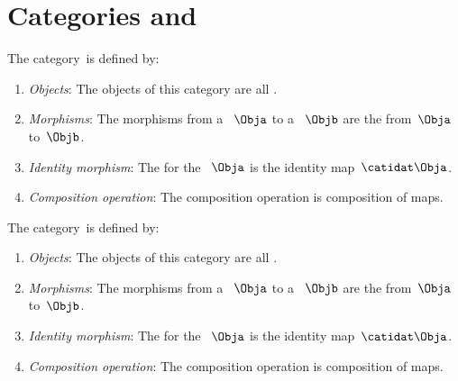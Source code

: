 \section{Categories \Lat and \BoundedLat}
\begin{ctdefinition}
    \label{def:Lat}
    The category~\Lat is defined by:
    \begin{enumerate}
        \item \emph{Objects}: The objects of this category are all .
        \item \emph{Morphisms}: The morphisms from a ~$\Obja$ to a ~$\Objb$ are the  from~$\Obja$ to~$\Objb$.
        \item \emph{Identity morphism}: The  for the ~$\Obja$
              is the identity map~$\catidat\Obja$.
        \item \emph{Composition operation}: The composition operation is composition of maps.
    \end{enumerate}
\end{ctdefinition}

\begin{ctdefinition}
    \label{def:BoundedLat}
    The category~\BoundedLat is defined by:
    \begin{enumerate}
        \item \emph{Objects}: The objects of this category are all .
        \item \emph{Morphisms}: The morphisms from a ~$\Obja$ to a ~$\Objb$ are the  from~$\Obja$ to~$\Objb$.
        \item \emph{Identity morphism}: The  for the ~$\Obja$
              is the identity map~$\catidat\Obja$.
        \item \emph{Composition operation}: The composition operation is composition of maps.
    \end{enumerate}
\end{ctdefinition}

